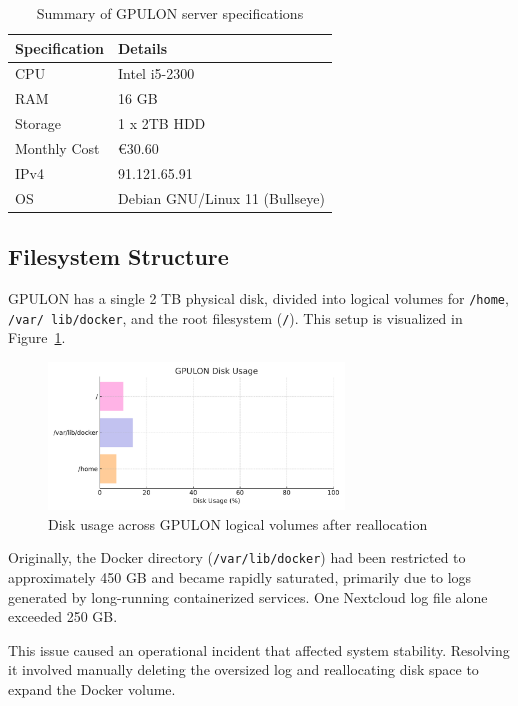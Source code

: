 \begin{table}[H]
  \centering
  \caption{Summary of GPULON server specifications}
  \label{tab:gpulon_specs}
  \begin{tabular}{ll}
    \rowcolor{udcpink!25}
    \textbf{Specification} & \textbf{Details} \\
    \hline
    CPU & Intel i5-2300 \\
    RAM & 16 GB \\
    Storage & 1 x 2TB HDD \\
    Monthly Cost & €30.60 \\
    IPv4 & 91.121.65.91 \\
    OS & Debian GNU/Linux 11 (Bullseye) \\
  \end{tabular}
\end{table}

\subsection*{Filesystem Structure}

GPULON has a single 2 TB physical disk, divided into logical volumes for \texttt{/home}, \texttt{/var/ lib/docker}, and the root filesystem (\texttt{/}). This setup is visualized in Figure~\ref{fig:gpulon_disk_usage}.

\begin{figure}[H]
  \centering
  \includegraphics[width=0.7\textwidth]{figuras/gpulon_disk_usage.pdf}
  \caption{Disk usage across GPULON logical volumes after reallocation}
  \label{fig:gpulon_disk_usage}
\end{figure}

Originally, the Docker directory (\texttt{/var/lib/docker}) had been restricted to approximately 450 GB and became rapidly saturated, primarily due to logs generated by long-running containerized services. One Nextcloud log file alone exceeded 250 GB.

This issue caused an operational incident that affected system stability. Resolving it involved manually deleting the oversized log and reallocating disk space to expand the Docker volume.

